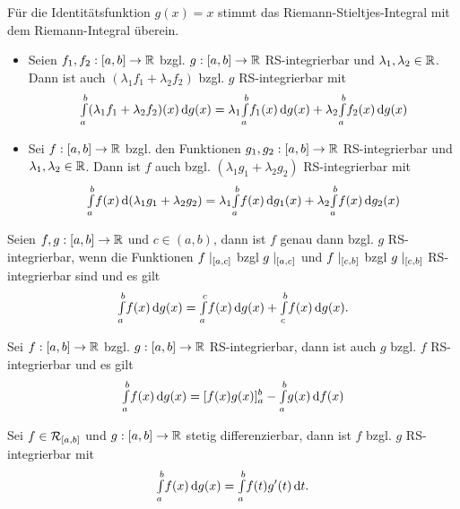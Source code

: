 \documentclass{cheat-sheet}
\begin{document}
\begin{bem}
Für die Identitätsfunktion $g(x) = x$ stimmt das Riemann-Stieltjes-Integral mit dem Riemann-Integral überein.
\end{bem}


\begin{satz}
\begin{itemize}
  \item Seien $f_1, f_2 : \left[ a, b \right] \to \mathbb{R}$ bzgl. $g : \left[ a, b \right] \to \mathbb{R}$ RS-integrierbar und $\lambda_1, \lambda_2 \in \mathbb{R}$. Dann ist auch $(\lambda_1 f_1 + \lambda_2 f_2)$ bzgl. $g$ RS-integrierbar mit
  \[ {\textstyle \int\limits_{a}^{b}} (\lambda_1 f_1 + \lambda_2 f_2)(x) \,\mathrm{d} g(x) = \lambda_1 {\textstyle \int\limits_{a}^{b}} f_1(x) \,\mathrm{d} g(x) + \lambda_2 {\textstyle \int\limits_{a}^{b}} f_2(x) \,\mathrm{d} g(x) \]
  \item Sei $f : \left[ a, b \right] \to \mathbb{R}$ bzgl. den Funktionen $g_1, g_2 : \left[ a, b \right] \to \mathbb{R}$ RS-integrierbar und $\lambda_1, \lambda_2 \in \mathbb{R}$. Dann ist $f$ auch bzgl. $(\lambda_1 g_1 + \lambda_2 g_2)$ RS-integrierbar mit
  \[ {\textstyle \int\limits_{a}^{b}} f(x) \,\mathrm{d} (\lambda_1 g_1 + \lambda_2 g_2) = \lambda_1 {\textstyle \int\limits_{a}^{b}} f(x) \,\mathrm{d} g_1(x) + \lambda_2 {\textstyle \int\limits_{a}^{b}} f(x) \,\mathrm{d} g_2(x) \]
\end{itemize}
\end{satz}

\begin{satz}
Seien $f, g : \left[ a, b \right] \to \mathbb{R}$ und $c \in (a, b)$, dann ist $f$ genau dann bzgl. $g$ RS-integrierbar, wenn die Funktionen $f\mid_{\left[ a, c \right]}$ bzgl $g\mid_{\left[ a, c \right]}$ und $f\mid_{\left[ c, b \right]}$ bzgl $g\mid_{\left[ c, b \right]}$ RS-integrierbar sind und es gilt
\[ {\textstyle \int\limits_{a}^{b}} f(x) \,\mathrm{d} g(x) = {\textstyle \int\limits_{a}^{c}} f(x) \,\mathrm{d} g(x) + {\textstyle \int\limits_{c}^{b}} f(x) \,\mathrm{d} g(x). \]
\end{satz}

\begin{satz}
Sei $f : \left[ a, b \right] \to \mathbb{R}$ bzgl. $g : \left[ a, b \right] \to \mathbb{R}$ RS-integrierbar, dann ist auch $g$ bzgl. $f$ RS-integrierbar und es gilt
\[ {\textstyle \int\limits_{a}^{b}} f(x) \,\mathrm{d} g(x) = [f(x)g(x)]_a^b - {\textstyle \int\limits_{a}^{b}} g(x) \,\mathrm{d} f(x) \]
\end{satz}

\begin{satz}
Sei $f \in \mathcal{R}_{\left[ a, b \right]}$ und $g : \left[ a, b \right] \to \mathbb{R}$ stetig differenzierbar, dann ist $f$ bzgl. $g$ RS-integrierbar mit
\[ {\textstyle \int\limits_{a}^{b}} f(x) \,\mathrm{d} g(x) = {\textstyle \int\limits_{a}^{b}} f(t)g'(t) \,\mathrm{d} t. \]
\end{satz}
\end{document}

